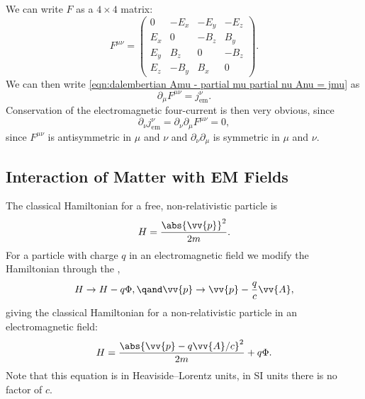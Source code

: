 \documentclass[fleqn]{NotesClass}
\newcommand{\EM}{\text{em}}
\begin{document}
\begin{appendices}
        We can write \(F\) as a \(4 \times 4\) matrix:
        \begin{equation}
            F^{\mu\nu} =
            \begin{pmatrix}
                0 & -E_x & -E_y & -E_z\\
                E_x & 0 & -B_z & B_y\\
                E_y & B_z & 0 & -B_z\\
                E_z & -B_y & B_x & 0
            \end{pmatrix} 
            .
        \end{equation}
        We can then write \cref{eqn:dalembertian Amu - partial mu partial nu Anu = jmu} as
        \begin{equation}
            \partial_\mu F^{\mu\nu} = j_{\EM}^{\nu}.
        \end{equation}
        Conservation of the electromagnetic four-current is then very obvious, since
        \begin{equation}
            \partial_\nu j_{\EM}^\nu = \partial_\nu \partial_\mu F^{\mu\nu} = 0,
        \end{equation}
        since \(F^{\mu\nu}\) is antisymmetric in \(\mu\) and \(\nu\) and \(\partial_\nu\partial_\mu\) is symmetric in \(\mu\) and \(\nu\).
        
        \subsection{Interaction of Matter with EM Fields}
        The classical Hamiltonian for a free, non-relativistic particle is
        \begin{equation}
            H = \frac{\abs{\vv{p}}^2}{2m}.
        \end{equation}
        For a particle with charge \(q\) in an electromagnetic field we modify the Hamiltonian through the ,
        \begin{equation}
            H \to H - q\Phi, \qand \vv{p} \to \vv{p} - \frac{q}{c}\vv{A},
        \end{equation}
        giving the classical Hamiltonian for a non-relativistic particle in an electromagnetic field:
        \begin{equation}
            H = \frac{\abs{\vv{p} - q\vv{A}/c}^2}{2m} + q\Phi.
        \end{equation}
        Note that this equation is in Heaviside--Lorentz units, in SI units there is no factor of \(c\).
        

\end{appendices}
\end{document}
